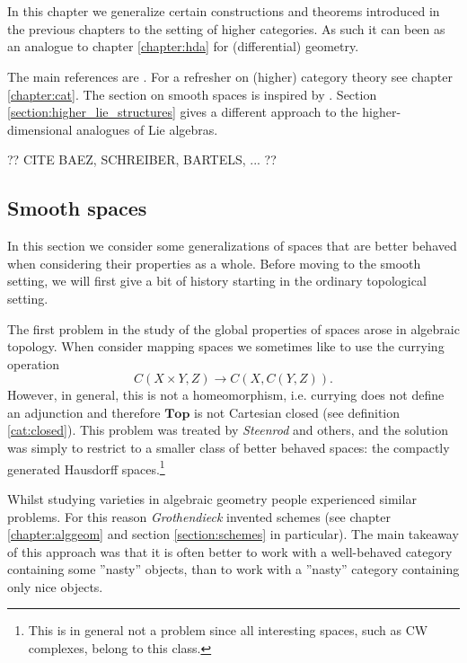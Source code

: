 \chapter{}\label{chapter:hdg}

    In this chapter we generalize certain constructions and theorems introduced in the previous chapters to the setting of higher categories. As such it can been as an analogue to chapter \ref{chapter:hda} for (differential) geometry.

    The main references are \cite{higher_gauge, phd_schreiber}. For a refresher on (higher) category theory see chapter \ref{chapter:cat}. The section on smooth spaces is inspired by \cite{baez_convenient}. Section \ref{section:higher_lie_structures} gives a different approach to the higher-dimensional analogues of Lie algebras.

    ?? CITE BAEZ, SCHREIBER, BARTELS, ... ??

\section{Smooth spaces}\label{section:smooth_spaces}

    In this section we consider some generalizations of spaces that are better behaved when considering their properties as a whole. Before moving to the smooth setting, we will first give a bit of history starting in the ordinary topological setting.

    The first problem in the study of the global properties of spaces arose in algebraic topology. When consider mapping spaces we sometimes like to use the currying operation \[C(X\times Y, Z)\rightarrow C(X, C(Y, Z)).\] However, in general, this is not a homeomorphism, i.e. currying does not define an adjunction and therefore $\mathbf{Top}$ is not Cartesian closed (see definition \ref{cat:closed}). This problem was treated by \textit{Steenrod} and others, and the solution was simply to restrict to a smaller class of better behaved spaces: the compactly generated Hausdorff spaces.\footnote{This is in general not a problem since all interesting spaces, such as CW complexes, belong to this class.}

    Whilst studying varieties in algebraic geometry people experienced similar problems. For this reason \textit{Grothendieck} invented schemes (see chapter \ref{chapter:alggeom} and section \ref{section:schemes} in particular). The main takeaway of this approach was that it is often better to work with a well-behaved category containing some ''nasty'' objects, than to work with a ''nasty'' category containing only nice objects.

